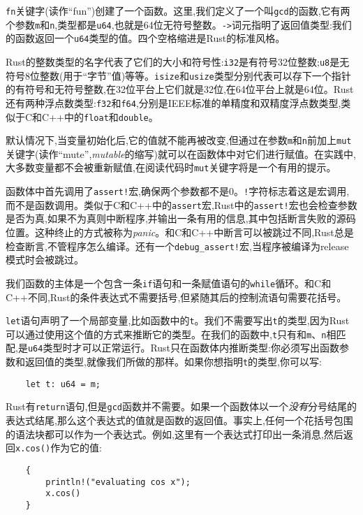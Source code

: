 \texttt{fn}关键字(读作“fun”)创建了一个函数。这里,我们定义了一个叫\texttt{gcd}的函数,它有两个参数\texttt{m}和\texttt{n},类型都是\texttt{u64},也就是64位无符号整数。\texttt{->}词元指明了返回值类型:我们的函数返回一个\texttt{u64}类型的值。四个空格缩进是Rust的标准风格。

Rust的整数类型的名字代表了它们的大小和符号性:\texttt{i32}是有符号32位整数;\texttt{u8}是无符号8位整数(用于“字节”值)等等。\texttt{isize}和\texttt{usize}类型分别代表可以存下一个指针的有符号和无符号整数,在32位平台上它们就是32位,在64位平台上就是64位。Rust还有两种浮点数类型:\texttt{f32}和\texttt{f64},分别是IEEE标准的单精度和双精度浮点数类型,类似于C和C++中的\texttt{float}和\texttt{double}。

默认情况下,当变量初始化后,它的值就不能再被改变,但通过在参数\texttt{m}和\texttt{n}前加上\texttt{mut}关键字(读作“mute”,\emph{mutable}的缩写)就可以在函数体中对它们进行赋值。在实践中,大多数变量都不会被重新赋值,在阅读代码时\texttt{mut}关键字将是一个有用的提示。

函数体中首先调用了\texttt{assert!}宏,确保两个参数都不是0。\texttt{!}字符标志着这是宏调用,而不是函数调用。类似于C和C++中的\texttt{assert}宏,Rust中的\texttt{assert!}宏也会检查参数是否为真,如果不为真则中断程序,并输出一条有用的信息,其中包括断言失败的源码位置。这种终止的方式被称为\emph{panic}。和C和C++中断言可以被跳过不同,Rust总是检查断言,不管程序怎么编译。还有一个\texttt{debug\_assert!}宏,当程序被编译为release模式时会被跳过。

我们函数的主体是一个包含一条\texttt{if}语句和一条赋值语句的\texttt{while}循环。和C和C++不同,Rust的条件表达式不需要括号,但紧随其后的控制流语句需要花括号。

\texttt{let}语句声明了一个局部变量,比如函数中的\texttt{t}。我们不需要写出\texttt{t}的类型,因为Rust可以通过使用这个值的方式来推断它的类型。在我们的函数中,\texttt{t}只有和\texttt{m}、\texttt{n}相匹配,是\texttt{u64}类型时才可以正常运行。Rust只在函数体内推断类型:你必须写出函数参数和返回值的类型,就像我们所做的那样。如果你想指明\texttt{t}的类型,你可以写:
\begin{verbatim}
    let t: u64 = m;
\end{verbatim}

Rust有\texttt{return}语句,但是\texttt{gcd}函数并不需要。如果一个函数体以一个\emph{没有}分号结尾的表达式结尾,那么这个表达式的值就是函数的返回值。事实上,任何一个花括号包围的语法块都可以作为一个表达式。例如,这里有一个表达式打印出一条消息,然后返回\texttt{x.cos()}作为它的值:
\begin{verbatim}
    {
        println!("evaluating cos x");
        x.cos()
    }
\end{verbatim}

